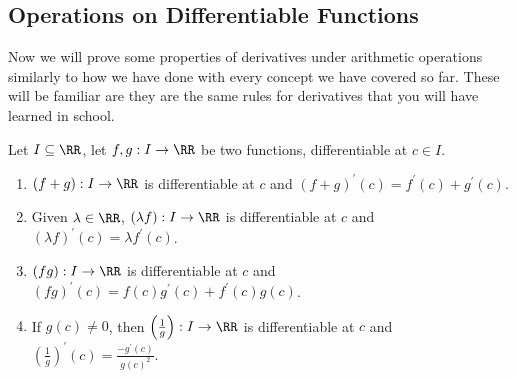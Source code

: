 \documentclass[../real_analysis.tex]{subfiles}
\begin{document}
        \subsection{Operations on Differentiable Functions}\label{subsec:operations-on-differentiable-functions}
            Now we will prove some properties of derivatives under arithmetic operations similarly to how we have done with every concept we have covered so far. These will be familiar are they are the same rules for derivatives that you will have learned in school.
            \begin{theorem}\label{thm:diff-func-props}
                Let $I\subseteq\RR$, let $f,g:I\to\RR$ be two functions, differentiable at $c\in I$.
                \begin{enumerate}[label={\upshape(\roman*)}]
                    \item $(f+g):I\to\RR$ is differentiable at $c$ and $(f+g)^\prime(c)=f^\prime(c)+g^\prime(c)$.
                    \item Given $\lambda\in\RR$, $(\lambda f):I\to\RR$ is differentiable at $c$ and $(\lambda f)^\prime(c)=\lambda f^\prime(c)$.
                    \item $(fg):I\to\RR$ is differentiable at $c$ and $(fg)^\prime(c)=f(c)g^\prime(c)+f^\prime(c)g(c)$.
                    \item If $g(c)\neq0$, then $\left(\frac{1}{g}\right):I\to\RR$ is differentiable at $c$ and $\left(\frac{1}{g}\right)^\prime(c)=\frac{-g^\prime(c)}{g(c)^2}$.
                \end{enumerate}
            \end{theorem}
\end{document}
